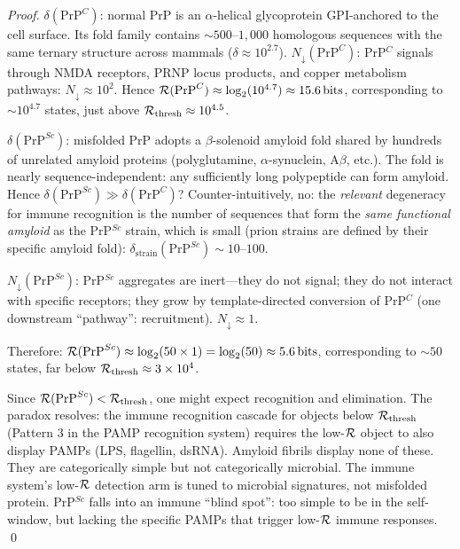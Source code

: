 \begin{proof}
$\delta(\mathrm{PrP}^C)$: normal PrP is an $\alpha$-helical glycoprotein
GPI-anchored to the cell surface. Its fold family contains $\sim 500$--$1{,}000$
homologous sequences with the same ternary structure across mammals
($\delta \approx 10^{2.7}$). $N_{\downarrow}(\mathrm{PrP}^C)$: PrP$^C$ signals
through NMDA receptors, PRNP locus products, and copper metabolism pathways:
$N_{\downarrow} \approx 10^2$. Hence $\mathcal{R}(\mathrm{PrP}^C) \approx \log_2(10^{4.7}) \approx 15.6\,\mathrm{bits}$,
corresponding to $\sim 10^{4.7}$ states, just above $\mathcal{R}_{\mathrm{thresh}} \approx 10^{4.5}$.

$\delta(\mathrm{PrP}^{Sc})$: misfolded PrP adopts a $\beta$-solenoid amyloid
fold shared by hundreds of unrelated amyloid proteins (polyglutamine, $\alpha$-synuclein,
A$\beta$, etc.). The fold is nearly sequence-independent: any sufficiently long
polypeptide can form amyloid. Hence $\delta(\mathrm{PrP}^{Sc}) \gg \delta(\mathrm{PrP}^C)$?
Counter-intuitively, no: the \emph{relevant} degeneracy for immune recognition
is the number of sequences that form the \emph{same functional amyloid} as the
PrP$^{Sc}$ strain, which is small (prion strains are defined by their specific
amyloid fold): $\delta_{\mathrm{strain}}(\mathrm{PrP}^{Sc}) \sim 10$--$100$.

$N_{\downarrow}(\mathrm{PrP}^{Sc})$: PrP$^{Sc}$ aggregates are inert---they
do not signal; they do not interact with specific receptors; they grow by
template-directed conversion of PrP$^C$ (one downstream ``pathway'':
recruitment). $N_{\downarrow} \approx 1$.

Therefore: $\mathcal{R}(\mathrm{PrP}^{Sc}) \approx \log_2(50 \times 1) = \log_2(50) \approx 5.6\,\mathrm{bits}$,
corresponding to $\sim 50$ states, far below $\mathcal{R}_{\mathrm{thresh}} \approx 3 \times 10^4$.

Since $\mathcal{R}(\mathrm{PrP}^{Sc}) < \mathcal{R}_{\mathrm{thresh}}$, one might expect
recognition and elimination. The paradox resolves: the immune recognition cascade
for objects below $\mathcal{R}_{\mathrm{thresh}}$ (Pattern 3 in the PAMP recognition
system) requires the low-$\mathcal{R}$ object to also display PAMPs (LPS, flagellin,
dsRNA). Amyloid fibrils display none of these. They are categorically simple but
not categorically microbial. The immune system's low-$\mathcal{R}$ detection arm
is tuned to microbial signatures, not misfolded protein. PrP$^{Sc}$ falls
into an immune ``blind spot'': too simple to be in the self-window, but lacking
the specific PAMPs that trigger low-$\mathcal{R}$ immune responses. \qed
\end{proof}

